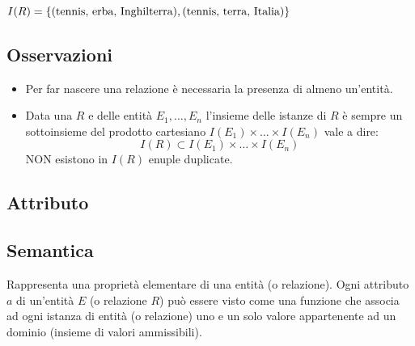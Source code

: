 \documentclass[a4paper, 10pt]{article}
\theoremstyle{definition}
\begin{document}
					\begin{figure}[h]
						
						\vspace*{0.5cm}
					
					\end{figure}
					$I(R) = \{(\textup{tennis, erba, Inghilterra}), (\textup{tennis, terra, Italia})\} $
				\subsection*{Osservazioni}
					\begin{itemize}
						\item Per far nascere una relazione è necessaria la presenza di almeno un'entità.	
						\item Data una $R$ e delle entità $ E_1,\dots , E_n$ l'insieme delle istanze di $R$ è sempre un sottoinsieme del prodotto cartesiano
						$ I(E_1) \times \dots \times I(E_n) $ vale a dire:
						\[
							I(R) \subset I(E_1) \times \dots \times I(E_n) 
						\]
						NON esistono in $I(R)$ enuple duplicate.
					\end{itemize}
					
				\newpage
				
			\subsection{Attributo}
				\subsection*{Semantica}
					Rappresenta una proprietà elementare di una entità (o relazione). Ogni attributo $a$ di un'entità $E$ (o relazione $R$) può essere visto come una funzione che associa ad ogni istanza di entità (o relazione) uno e un solo valore appartenente ad un dominio (insieme di valori ammissibili).
\end{document}

